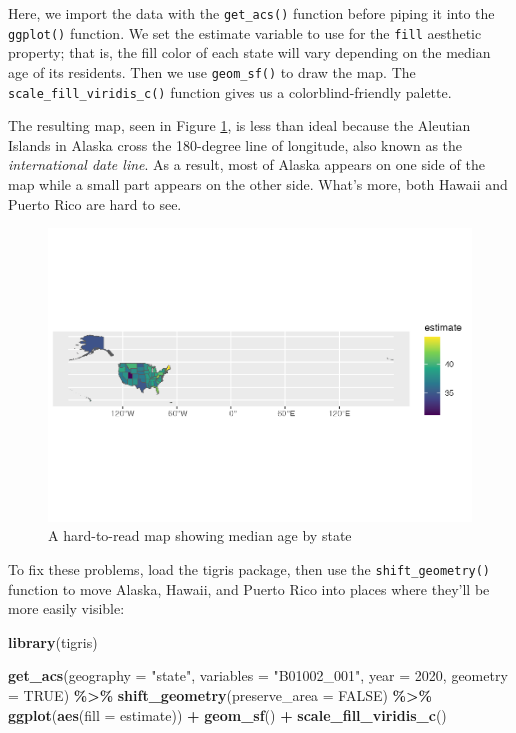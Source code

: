 \documentclass[
]{book}
\newenvironment{Shaded}{\begin{snugshade}}{\end{snugshade}}
\newcommand{\AttributeTok}[1]{\textcolor[rgb]{0.13,0.29,0.53}{#1}}
\newcommand{\ConstantTok}[1]{\textcolor[rgb]{0.56,0.35,0.01}{#1}}
\newcommand{\DecValTok}[1]{\textcolor[rgb]{0.00,0.00,0.81}{#1}}
\newcommand{\FunctionTok}[1]{\textcolor[rgb]{0.13,0.29,0.53}{\textbf{#1}}}
\newcommand{\NormalTok}[1]{#1}
\newcommand{\SpecialCharTok}[1]{\textcolor[rgb]{0.81,0.36,0.00}{\textbf{#1}}}
\newcommand{\StringTok}[1]{\textcolor[rgb]{0.31,0.60,0.02}{#1}}
\begin{document}
Here, we import the data with the \texttt{get\_acs()} function before piping it into the \texttt{ggplot()} function. We set the estimate variable to use for the \texttt{fill} aesthetic property; that is, the fill color of each state will vary depending on the median age of its residents. Then we use \texttt{geom\_sf()} to draw the map. The \texttt{scale\_fill\_viridis\_c()} function gives us a colorblind-friendly palette.

The resulting map, seen in Figure \ref{fig:median-age-map-bad}, is less than ideal because the Aleutian Islands in Alaska cross the 180-degree line of longitude, also known as the \emph{international date line}. As a result, most of Alaska appears on one side of the map while a small part appears on the other side. What's more, both Hawaii and Puerto Rico are hard to see.

\begin{figure}
\includegraphics[width=1\linewidth]{accessing-data_files/figure-latex/median-age-map-bad-1} \caption{A hard-to-read map showing median age by state}\label{fig:median-age-map-bad}
\end{figure}

To fix these problems, load the tigris package, then use the \texttt{shift\_geometry()} function to move Alaska, Hawaii, and Puerto Rico into places where they'll be more easily visible:

\begin{Shaded}
\begin{Highlighting}[]
\FunctionTok{library}\NormalTok{(tigris)}

\FunctionTok{get\_acs}\NormalTok{(}\AttributeTok{geography =} \StringTok{"state"}\NormalTok{,}
        \AttributeTok{variables =} \StringTok{"B01002\_001"}\NormalTok{,}
        \AttributeTok{year =} \DecValTok{2020}\NormalTok{,}
        \AttributeTok{geometry =} \ConstantTok{TRUE}\NormalTok{) }\SpecialCharTok{\%\textgreater{}\%} 
  \FunctionTok{shift\_geometry}\NormalTok{(}\AttributeTok{preserve\_area =} \ConstantTok{FALSE}\NormalTok{) }\SpecialCharTok{\%\textgreater{}\%} 
  \FunctionTok{ggplot}\NormalTok{(}\FunctionTok{aes}\NormalTok{(}\AttributeTok{fill =}\NormalTok{ estimate)) }\SpecialCharTok{+}
  \FunctionTok{geom\_sf}\NormalTok{() }\SpecialCharTok{+}
  \FunctionTok{scale\_fill\_viridis\_c}\NormalTok{()}
\end{Highlighting}
\end{Shaded}
\end{document}
